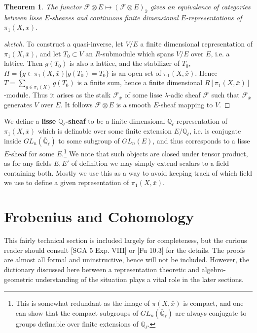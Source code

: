 \documentclass{ucbthesis}
\newtheorem{thm}{Theorem}[section]
\theoremstyle{definition}
\theoremstyle{theorem}
\begin{document}
\begin{thm}The functor $\mathcal{F}\otimes E \mapsto  (\mathcal{F}\otimes E)_{\bar{x}}$ gives an equivalence of  categories between lisse $E$-sheaves and continuous finite dimensional $E$-representations of $\pi_{1}(X,\bar{x})$.
\end{thm}
\begin{proof}[sketch]
To construct a quasi-inverse, let $V/E$ a finite dimensional representation of $\pi_{1}(X,\bar{x})$, and let $T_{0}\subset V$ an $R$-submodule which spans $V/E$ over $E$, i.e. a lattice. Then $g(T_{0})$ is also a lattice, and the stabilizer of $T_{0}$, $H=\{g\in\pi_{1}(X,\bar{x})|g(T_{0})=T_{0}\}$ is an open set of $\pi_{1}(X,\bar{x})$. Hence $T = \sum\limits_{g\in\pi_{1}(X)}g(T_{0})$ is a finite sum, hence a finite dimensional $R[\pi_{1}(X,
\bar{x})]$-module. Thus it arises as the stalk $\mathcal{F}_{\bar{x}}$ of some lisse $\lambda$-adic sheaf $\mathcal{F}$ such that $\mathcal{F}_{\bar{x}}$ generates $V$ over $E$. It follows  $\mathcal{F}\otimes E$ is a smooth $E$-sheaf mapping to $V$. 
\end{proof}

We define a \textbf{lisse $\overline{\mathbb{Q}}_{\ell}$-sheaf} to be a finite dimensional
 $\overline{\mathbb{Q}}_{\ell}$-representation of $\pi_{1}(X,\bar{x})$ which is definable over some finite
  extension $E/\mathbb{Q}_{\ell}$, i.e. is conjugate inside $GL_{n}(\overline{\mathbb{Q}}_{\ell})$ to some
   subgroup of $GL_{n}(E)$, and thus corresponds to a lisse $E$-sheaf for some $E$.\footnote{This is somewhat redundant as the image of $\pi(X,\bar{x})$ is compact, and one can show that the compact subgroups of $GL_{n}(\overline{\mathbb{Q}}_{\ell})$ are always conjugate to groups definable over finite extensions of $\mathbb{Q}_{\ell}$.} We note that such objects are closed under tensor product, as for any fields
    $E,E'$ of definition we may simply extend scalars to a field containing both. Mostly we use this as a
     way to avoid keeping track of which field we use to define a given representation of $\pi_{1}(X,\bar{x})$. 



\section{Frobenius and Cohomology}
This fairly technical section is included largely for completeness, but the curious reader should consult [SGA 5 Exp. VIII] or [Fu 10.3] for the details. The proofs are almost all formal and uninstructive, hence will not be included. However, the dictionary discussed here between a representation theoretic and algebro-geometric understanding of the situation plays a vital role in the later sections. 
\end{document}
